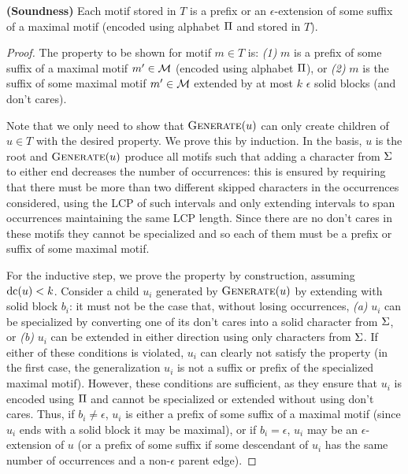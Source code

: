 \begin{lemma}\label{lem:soundness}
\textbf{(Soundness)} Each motif stored in $T$ is a prefix or an $\epsilon$-extension of some suffix of a maximal motif (encoded using alphabet $\Pi$ and stored in $T$).
\end{lemma}
\begin{proof}
    The property to be shown for motif $m \in T$ is: \emph{(1)} $m$ is a prefix of some suffix of a maximal motif $m' \in \mathcal{M}$ (encoded using alphabet $\Pi$), or \emph{(2)} $m$ is the suffix of some maximal motif $m' \in \mathcal{M}$ extended by at most $k$ $\epsilon$ solid blocks (and don't cares). 
    
    Note that we only need to show that $\operatorname{\textsc{Generate}}(u)$ can only create children of $u \in T$ with the desired property. We prove this by induction. In the basis, $u$ is the root and $\operatorname{\textsc{Generate}}(u)$ produce all motifs such that adding a character from $\Sigma$ to either end decreases the number of occurrences: this is ensured by requiring that there must be more than two different skipped characters in the occurrences considered, using the LCP of such intervals and only extending intervals to span occurrences maintaining  the same LCP length. Since there are no don't cares in these motifs they cannot be specialized and so each of them must be a prefix or suffix of some maximal motif.
    
    For the inductive step, we prove the property by construction, assuming $\operatorname{dc}(u) < k$. Consider a child $u_i$ generated by $\operatorname{\textsc{Generate}}(u)$ by extending with solid block $b_i$: it must not be the case that, without losing occurrences,
    \emph{(a)} $u_i$ can be specialized by converting one of its don't cares into a solid character from $\Sigma$, or
    \emph{(b)} $u_i$ can be extended in either direction using only characters from $\Sigma$.
    If either of these conditions is violated, $u_i$ can clearly not satisfy the property (in the first case, the generalization $u_i$ is not a suffix or prefix of the specialized maximal motif). However, these conditions are sufficient, as they ensure that $u_i$ is encoded using $\Pi$ and cannot be specialized or extended without using don't cares. Thus, if $b_i \not = \epsilon$, $u_i$ is either a prefix of some suffix of a maximal motif (since $u_i$ ends with a solid block it may be maximal), or if $b_i = \epsilon$, $u_i$ may be an $\epsilon$-extension of $u$ (or a prefix of some suffix if some descendant of $u_i$ has the same number of occurrences and a non-$\epsilon$ parent edge).  
    

\end{proof}
